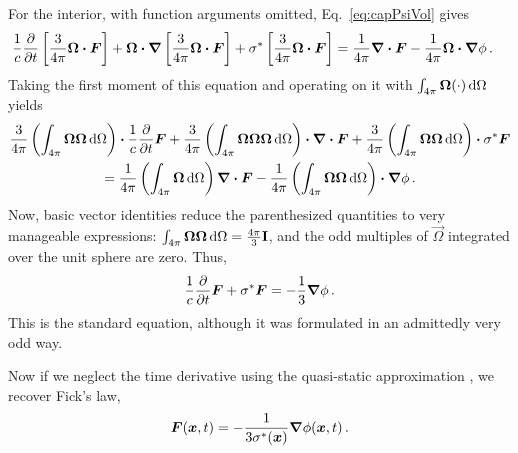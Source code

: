 For the interior, with function arguments omitted, Eq.~\eqref{eq:capPsiVol} gives
\begin{align*}
  \frac{1}{c} \frac{\partial }{\partial t} \left[ \frac{3}{4\pi} \bm{\Omega} \bm{\cdot} \bm{F} \right]
  + \bm{\Omega}\bm{\cdot} \bm{\nabla} \left[ \frac{3}{4\pi} \bm{\Omega} \bm{\cdot} \bm{F} \right]
  + \sigma^\ast \left[ \frac{3}{4\pi} \bm{\Omega} \bm{\cdot} \bm{F} \right]
  &= \frac{1}{4\pi} \bm{\nabla} \bm{\cdot}\bm{F}
  - \frac{1}{4\pi} \bm{\Omega}\bm{\cdot} \bm{\nabla} \phi\,.
\end{align*}
Taking the first moment of this equation and operating on it with $\int_{4\pi}
\bm{\Omega}(\cdot) \mathop{}\!\mathrm{d}\Omega$ yields
\begin{multline*}
\frac{3}{4\pi} \left( \int_{4\pi} \bm{\Omega}\bm{\Omega}\mathop{}\!\mathrm{d}\Omega \right) \bm{\cdot}
\frac{1}{c} \frac{\partial }{\partial t} \bm{F}
+ \frac{3}{4\pi} \left( \int_{4\pi}
  \bm{\Omega}\bm{\Omega}\bm{\Omega}\mathop{}\!\mathrm{d}\Omega \right)
\bm{\cdot} \bm{\nabla} \bm{\cdot} \bm{F}
+ \frac{3}{4\pi} \left( \int_{4\pi} \bm{\Omega}\bm{\Omega}\mathop{}\!\mathrm{d}\Omega \right)
\bm{\cdot} \sigma^\ast \bm{F}
\\
= \frac{1}{4\pi} \left( \int_{4\pi} \bm{\Omega}\mathop{}\!\mathrm{d}\Omega \right)
\bm{\nabla} \bm{\cdot}\bm{F}
- \frac{1}{4\pi} \left( \int_{4\pi} \bm{\Omega}\bm{\Omega}\mathop{}\!\mathrm{d}\Omega \right)\bm{\cdot} \bm{\nabla} \phi\,.
\end{multline*}
Now, basic vector identities \cite{Lar2007} reduce the parenthesized
quantities to very manageable expressions: $\int_{4\pi}
\bm{\Omega}\bm{\Omega}\mathop{}\!\mathrm{d}\Omega=\frac{4\pi}{3}\mathbf{I}$, and the odd
multiples of $\vec{\Omega}$ integrated over the unit sphere are zero. Thus,
\begin{equation*}
  \frac{1}{c} \frac{\partial }{\partial t} \bm{F}
  + \sigma^\ast \bm{F}
  =
  - \frac{1}{3} \bm{\nabla} \phi\,.
\end{equation*}
This is the standard \Pone{} equation, although it was formulated in an
admittedly very odd way.

Now if we neglect the time derivative using the quasi-static approximation
\cite{Dud1976}, we recover Fick's law,
\begin{equation*}
\bm{F}(\bm{x}, t) = - \frac{1}{3\sigma^\ast(\bm{x})} \bm{\nabla} \phi(\bm{x}, t) \,.
\end{equation*}

